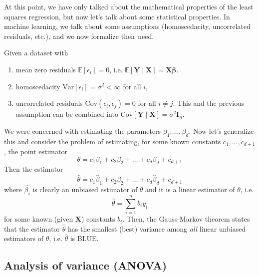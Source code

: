 \documentclass{article}
\begin{document}
    At this point, we have only talked about the mathematical properties of the least squares regression, but now let's talk about some statistical properties. In machine learning, we talk about some assumptions (homoscedacity, uncorrelated residuals, etc.), and we now formalize their need. 

    \begin{theorem}
      Given a dataset with 
      \begin{enumerate}
        \item mean zero residuals $\mathbb{E}[\epsilon_i] = 0$, i.e. $\mathbb{E}[\mathbf{Y} \mid \mathbf{X}] = \mathbf{X} \boldsymbol{\beta}$. 
        \item homoscedacity $\mathrm{Var}[\epsilon_i] = \sigma^2 < \infty$ for all $i$, 
        \item uncorrelated residuals $\mathrm{Cov}(\epsilon_i, \epsilon_j) = 0$ for all $i \neq j$. This and the previous assumption can be combined into $\mathrm{Cov}[\mathbf{Y} \mid \mathbf{X}] = \sigma^2 \mathbf{I}_n$. 
      \end{enumerate}
      We were concerned with estimating the parameters $\beta_1, \ldots, \beta_d$. Now let's generalize this and consider the problem of estimating, for some known constants $c_1, \ldots, c_{d+1}$, the point estimator 
      \begin{equation}
        \theta = c_1 \beta_1 + c_2 \beta_2 + \ldots + c_d \beta_d + c_{d+1}
      \end{equation}
      Then the estimator 
      \begin{equation}
        \hat{\theta} = c_1 \hat{\beta}_1 + c_2 \hat{\beta}_2 + \ldots + c_d \hat{\beta}_d + c_{d+1}
      \end{equation}
      where $\hat{\beta_i}$ is clearly an unbiased estimator of $\theta$ and it is a linear estimator of $\theta$, i.e. 
      \begin{equation}
        \hat{\theta} = \sum_{i=1}^n b_i y_i
      \end{equation}
      for some known (given $\mathbf{X}$) constants $b_i$. Then, the Gauss-Markov theorem states that the estimator $\hat{\theta}$ has the smallest (best) variance among \textit{all} linear unbiased estimators of $\theta$, i.e. $\hat{\theta}$ is BLUE. 
    \end{theorem}

  \subsection{Analysis of variance (ANOVA)}
\end{document}
